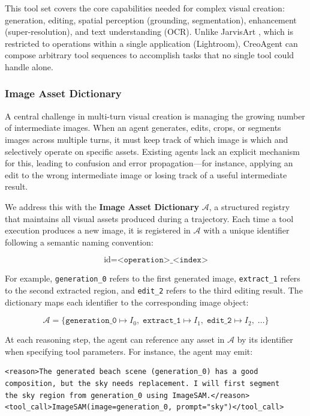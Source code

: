 \documentclass{article}
\begin{document}
This tool set covers the core capabilities needed for complex visual creation: generation, editing, spatial perception (grounding, segmentation), enhancement (super-resolution), and text understanding (OCR). Unlike JarvisArt \cite{lin2025jarvisart}, which is restricted to operations within a single application (Lightroom), CreoAgent can compose arbitrary tool sequences to accomplish tasks that no single tool could handle alone.

\subsubsection{Image Asset Dictionary}

A central challenge in multi-turn visual creation is managing the growing number of intermediate images. When an agent generates, edits, crops, or segments images across multiple turns, it must keep track of which image is which and selectively operate on specific assets. Existing agents lack an explicit mechanism for this, leading to confusion and error propagation—for instance, applying an edit to the wrong intermediate image or losing track of a useful intermediate result.

We address this with the \textbf{Image Asset Dictionary} $\mathcal{A}$, a structured registry that maintains all visual assets produced during a trajectory. Each time a tool execution produces a new image, it is registered in $\mathcal{A}$ with a unique identifier following a semantic naming convention:

$$\text{id} = \texttt{<operation>\_<index>}$$

For example, \texttt{generation\_0} refers to the first generated image, \texttt{extract\_1} refers to the second extracted region, and \texttt{edit\_2} refers to the third editing result. The dictionary maps each identifier to the corresponding image object:

$$\mathcal{A} = \{ \texttt{generation\_0} \mapsto I_0, \; \texttt{extract\_1} \mapsto I_1, \; \texttt{edit\_2} \mapsto I_2, \; \ldots \}$$

At each reasoning step, the agent can reference any asset in $\mathcal{A}$ by its identifier when specifying tool parameters. For instance, the agent may emit:

\begin{verbatim}
<reason>The generated beach scene (generation_0) has a good 
composition, but the sky needs replacement. I will first segment 
the sky region from generation_0 using ImageSAM.</reason>
<tool_call>ImageSAM(image=generation_0, prompt="sky")</tool_call>
\end{verbatim}
\end{document}
